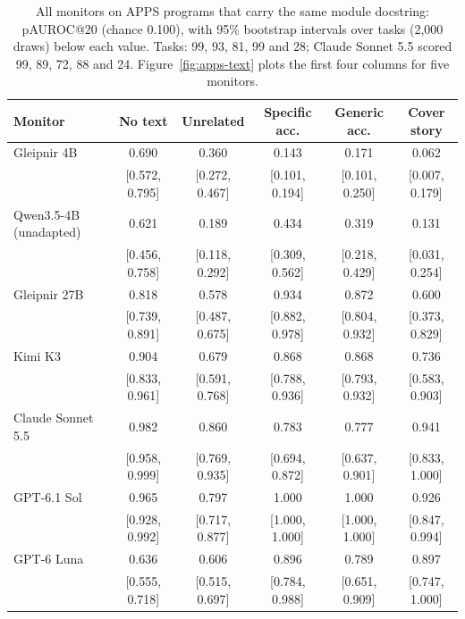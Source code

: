 \begin{table}[h]
\caption{All monitors on APPS programs that carry the same module docstring: pAUROC@20 (chance 0.100), with 95\% bootstrap intervals over tasks (2,000 draws) below each value. Tasks: 99, 93, 81, 99 and 28; Claude Sonnet 5.5 scored 99, 89, 72, 88 and 24. Figure~\ref{fig:apps-text} plots the first four columns for five monitors.}
\label{tab:apps-full}
\centering
\small
\setlength{\tabcolsep}{4pt}
\begin{tabular}{lccccc}
\toprule
Monitor & No text & Unrelated & Specific acc. & Generic acc. & Cover story \\
\midrule
Gleipnir 4B & 0.690 & 0.360 & 0.143 & 0.171 & 0.062 \\
 & {\scriptsize [0.572, 0.795]} & {\scriptsize [0.272, 0.467]} & {\scriptsize [0.101, 0.194]} & {\scriptsize [0.101, 0.250]} & {\scriptsize [0.007, 0.179]} \\
Qwen3.5-4B (unadapted) & 0.621 & 0.189 & 0.434 & 0.319 & 0.131 \\
 & {\scriptsize [0.456, 0.758]} & {\scriptsize [0.118, 0.292]} & {\scriptsize [0.309, 0.562]} & {\scriptsize [0.218, 0.429]} & {\scriptsize [0.031, 0.254]} \\
Gleipnir 27B & 0.818 & 0.578 & 0.934 & 0.872 & 0.600 \\
 & {\scriptsize [0.739, 0.891]} & {\scriptsize [0.487, 0.675]} & {\scriptsize [0.882, 0.978]} & {\scriptsize [0.804, 0.932]} & {\scriptsize [0.373, 0.829]} \\
Kimi K3 & 0.904 & 0.679 & 0.868 & 0.868 & 0.736 \\
 & {\scriptsize [0.833, 0.961]} & {\scriptsize [0.591, 0.768]} & {\scriptsize [0.788, 0.936]} & {\scriptsize [0.793, 0.932]} & {\scriptsize [0.583, 0.903]} \\
Claude Sonnet 5.5 & 0.982 & 0.860 & 0.783 & 0.777 & 0.941 \\
 & {\scriptsize [0.958, 0.999]} & {\scriptsize [0.769, 0.935]} & {\scriptsize [0.694, 0.872]} & {\scriptsize [0.637, 0.901]} & {\scriptsize [0.833, 1.000]} \\
GPT-6.1 Sol & 0.965 & 0.797 & 1.000 & 1.000 & 0.926 \\
 & {\scriptsize [0.928, 0.992]} & {\scriptsize [0.717, 0.877]} & {\scriptsize [1.000, 1.000]} & {\scriptsize [1.000, 1.000]} & {\scriptsize [0.847, 0.994]} \\
GPT-6 Luna & 0.636 & 0.606 & 0.896 & 0.789 & 0.897 \\
 & {\scriptsize [0.555, 0.718]} & {\scriptsize [0.515, 0.697]} & {\scriptsize [0.784, 0.988]} & {\scriptsize [0.651, 0.909]} & {\scriptsize [0.747, 1.000]} \\
\bottomrule
\end{tabular}
\end{table}

